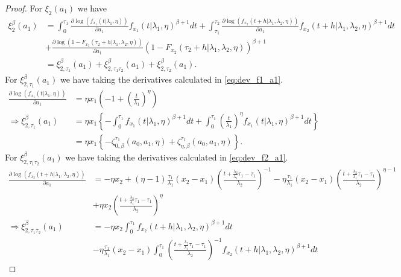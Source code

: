\documentclass{article}
\begin{document}
\begin{proof}
For $\xi_2(a_1)$ we have
\begin{align*}
\xi_2^{\beta}(a_1)&=\int_{0}^{\tau_1}\frac{\partial \log\left(f_{x_1}(t|\lambda_1,\eta)\right)}{\partial a_1}f_{x_1}(t|\lambda_1,\eta)^{\beta+1}dt+\int_{\tau_1}^{\tau_2}\frac{\partial \log\left(f_{x_2}(t+h|\lambda_1,\lambda_2,\eta)\right)}{\partial a_1} f_{x_2}(t+h|\lambda_1,\lambda_2,\eta)^{\beta+1}dt
\\
&+\frac{\partial \log\left(1-F_{x_2}(\tau_2+h|\lambda_1,\lambda_2,\eta)\right)}{\partial a_1}\left(1-F_{x_2}(\tau_2+h|\lambda_1,\lambda_2,\eta)\right)^{\beta+1}
\\
&=\xi_{2,\tau_1}^{\beta}(a_1)+\xi_{2,\tau_1 \tau_2}^{\beta} (a_1)+ \xi_{2,\tau_2}^{\beta}(a_1).
\end{align*}
For $\xi_{2,\tau_1}^{\beta}(a_1)$ we have taking the derivatives calculated in \eqref{eq:dev_f1_a1}.
\begin{align*}
\frac{\partial \log\left(f_{x_1}(t|\lambda_1,\eta)\right)}{\partial a_1}&=\eta x_1\left(-1+\left(\frac{t}{\lambda_1}\right)^{\eta}\right)
\\
\Rightarrow  \xi_{2,\tau_1}^{\beta}(a_1)&=\eta x_1 \left\{-\int_{0}^{\tau_1}f_{x_1}(t|\lambda_1,\eta)^{\beta+1}dt+\int_{0}^{\tau_1}\left(\frac{t}{\lambda_1}\right)^{\eta}f_{x_1}(t|\lambda_1,\eta)^{\beta+1}dt \right\}
\\
&=\eta x_1\left\{-\zeta_{0,\beta}^{\tau_1}(a_0,a_1,\eta)+\zeta_{\eta,\beta}^{\tau_1}(a_0,a_1,\eta)\right\}.
\end{align*}
For $\xi_{2,\tau_1\tau_2}^{\beta}(a_1)$ we have taking the derivatives calculated in \eqref{eq:dev_f2_a1}.
\begin{align*}
\frac{\partial \log\left(f_{x_2}(t+h|\lambda_1,\lambda_2,\eta)\right)}{\partial a_1}&=-\eta x_2 +(\eta-1) \frac{\tau_1}{\lambda_1}(x_2-x_1)\left(\frac{t+\frac{\lambda_2}{\lambda_1}\tau_1-\tau_1}{\lambda_2}\right)^{-1}-\eta\frac{\tau_1}{\lambda_1}(x_2-x_1)\left(\frac{t+\frac{\lambda_2}{\lambda_1}\tau_1-\tau_1}{\lambda_2}\right)^{\eta-1}\nonumber
\\
&+\eta x_2\left(\frac{t+\frac{\lambda_2}{\lambda_1}\tau_1-\tau_1}{\lambda_2}\right)^{\eta} \nonumber
\\
\Rightarrow  \xi_{2,\tau_1\tau_2}^{\beta}(a_1)&=-\eta x_2 \int_{0}^{\tau_1}f_{x_2}(t+h|\lambda_1,\lambda_2,\eta)^{\beta+1}dt
\\
&-\eta\frac{\tau_1}{\lambda_1}(x_2-x_1)\int_{0}^{\tau_1}\left(\frac{t+\frac{\lambda_2}{\lambda_1}\tau_1-\tau_1}{\lambda_2}\right)^{-1}f_{x_2}(t+h|\lambda_1,\lambda_2,\eta)^{\beta+1}dt 

\end{align*}
\end{proof}
\end{document}
